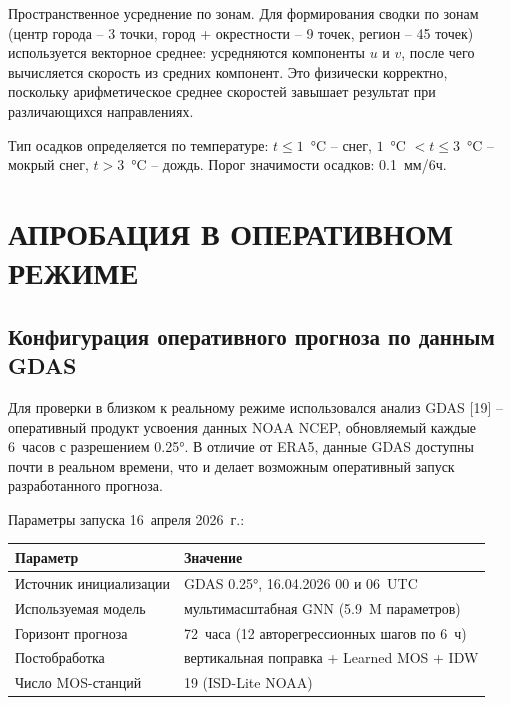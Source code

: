 \documentclass[14pt,a4paper]{extarticle}
\newcounter{none}
\numberwithin{table}{section}
\numberwithin{figure}{section}
\numberwithin{equation}{section}
\begin{document}
Пространственное усреднение по зонам.
Для формирования сводки по зонам (центр города -- 3 точки, город +
окрестности -- 9 точек, регион -- 45 точек) используется
векторное среднее: усредняются компоненты $u$ и $v$, после чего
вычисляется скорость из средних компонент. Это физически корректно,
поскольку арифметическое среднее скоростей завышает результат при
различающихся направлениях.

Тип осадков определяется по температуре: $t \leq 1$~°C -- снег,
$1$~°C $< t \leq 3$~°C -- мокрый снег, $t > 3$~°C -- дождь. Порог
значимости осадков: 0.1~мм/6ч.


\newpage

\section{АПРОБАЦИЯ В ОПЕРАТИВНОМ РЕЖИМЕ}\label{ux430ux43fux440ux43eux431ux430ux446ux438ux44f-ux432-ux43eux43fux435ux440ux430ux442ux438ux432ux43dux43eux43c-ux440ux435ux436ux438ux43cux435}

\subsection{Конфигурация оперативного прогноза по данным GDAS}\label{ux43aux43eux43dux444ux438ux433ux443ux440ux430ux446ux438ux44f-live-ux43fux430ux439ux43fux43bux430ux439ux43dux430-ux43dux430-gdas}

Для проверки в близком к реальному режиме использовался анализ
GDAS [19] -- оперативный продукт усвоения данных NOAA NCEP,
обновляемый каждые 6~часов с разрешением 0.25°. В отличие от ERA5,
данные GDAS доступны почти в реальном времени, что и делает возможным
оперативный запуск разработанного прогноза.

Параметры запуска 16~апреля 2026~г.:

{\def\LTcaptype{none}
\begin{longtable}[]{@{}ll@{}}
\toprule\noalign{}
Параметр & Значение \\
\midrule\noalign{}
\endhead
\bottomrule\noalign{}
\endlastfoot
Источник инициализации & GDAS 0.25°, 16.04.2026 00 и 06~UTC \\
Используемая модель & мультимасштабная GNN (5.9~M параметров) \\
Горизонт прогноза & 72~часа (12 авторегрессионных шагов по 6~ч) \\
Постобработка & вертикальная поправка + Learned MOS + IDW \\
Число MOS-станций & 19 (ISD-Lite NOAA) \\
\end{longtable}
}
\end{document}
